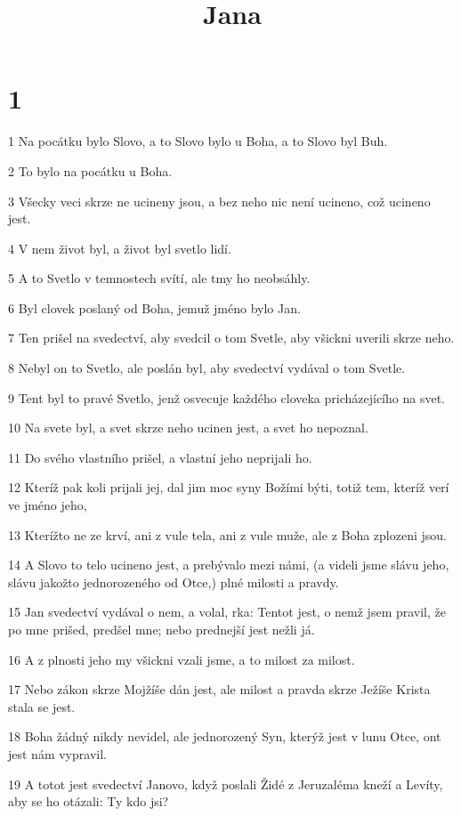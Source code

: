 

\title{ Jana}

\chapter{1}

\par 1 Na pocátku bylo Slovo, a to Slovo bylo u Boha, a to Slovo byl Buh.
\par 2 To bylo na pocátku u Boha.
\par 3 Všecky veci skrze ne ucineny jsou, a bez neho nic není ucineno, což ucineno jest.
\par 4 V nem život byl, a život byl svetlo lidí.
\par 5 A to Svetlo v temnostech svítí, ale tmy ho neobsáhly.
\par 6 Byl clovek poslaný od Boha, jemuž jméno bylo Jan.
\par 7 Ten prišel na svedectví, aby svedcil o tom Svetle, aby všickni uverili skrze neho.
\par 8 Nebyl on to Svetlo, ale poslán byl, aby svedectví vydával o tom Svetle.
\par 9 Tent byl to pravé Svetlo, jenž osvecuje každého cloveka pricházejícího na svet.
\par 10 Na svete byl, a svet skrze neho ucinen jest, a svet ho nepoznal.
\par 11 Do svého vlastního prišel, a vlastní jeho neprijali ho.
\par 12 Kteríž pak koli prijali jej, dal jim moc syny Božími býti, totiž tem, kteríž verí ve jméno jeho,
\par 13 Kterížto ne ze krví, ani z vule tela, ani z vule muže, ale z Boha zplozeni jsou.
\par 14 A Slovo to telo ucineno jest, a prebývalo mezi námi, (a videli jsme slávu jeho, slávu jakožto jednorozeného od Otce,) plné milosti a pravdy.
\par 15 Jan svedectví vydával o nem, a volal, rka: Tentot jest, o nemž jsem pravil, že po mne prišed, predšel mne; nebo prednejší jest nežli já.
\par 16 A z plnosti jeho my všickni vzali jsme, a to milost za milost.
\par 17 Nebo zákon skrze Mojžíše dán jest, ale milost a pravda skrze Ježíše Krista stala se jest.
\par 18 Boha žádný nikdy nevidel, ale jednorozený Syn, kterýž jest v lunu Otce, ont jest nám vypravil.
\par 19 A totot jest svedectví Janovo, když poslali Židé z Jeruzaléma kneží a Levíty, aby se ho otázali: Ty kdo jsi?
